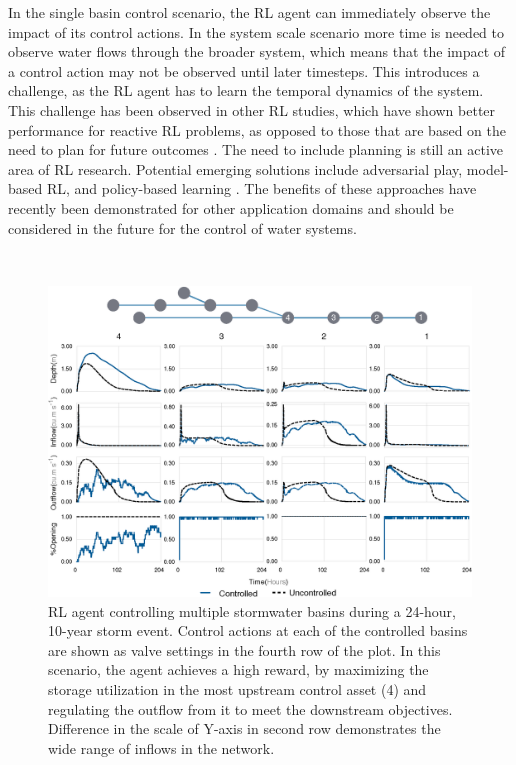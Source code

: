 In the single basin control scenario, the RL agent can immediately observe the impact of its control actions.
In the system scale scenario more time is needed to observe water flows through the broader system, which means that the impact of a control action may not be observed until later timesteps.
This introduces a challenge, as the RL agent has to learn the temporal dynamics of the system.
This challenge has been observed in other RL studies, which have shown better performance for reactive RL problems, as opposed to those that are based on the need to plan for future outcomes \cite{aytar2018playing}.
The need to include planning is still an active area of RL research.
Potential emerging solutions include adversarial play\cite{silver2017masteringgo,Silver2017MasteringAlgorithm}, model-based RL\cite{clavera2018model}, and policy-based learning \cite{Schulman2017ProximalAlgorithms}.
The benefits of these approaches have recently been demonstrated for other application domains and should be considered in the future for the control of water systems.

\

\begin{figure}
    \centering
    \includegraphics[width=\textwidth]{gfx/Chapter-3/system_scale_2.eps}
    \caption{RL agent controlling multiple stormwater basins during a 24-hour, 10-year storm event. Control actions at each of the controlled basins are shown as valve settings in the fourth row of the plot. In this scenario, the agent achieves a high reward, by maximizing the storage utilization in the most upstream control asset (4) and regulating the outflow from it to meet the downstream objectives. Difference in the scale of Y-axis in second row demonstrates the wide range of inflows in the network.}\label{fig:ch3-fig6}
\end{figure}

